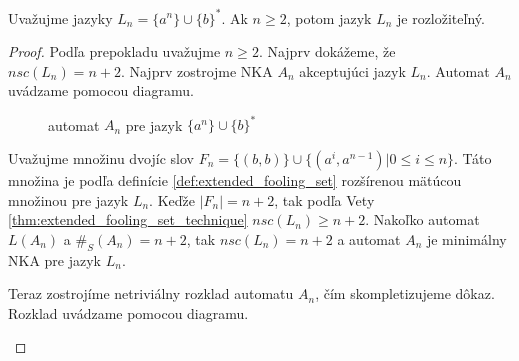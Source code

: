 \begin{proposition}
\label{thm:a^nub^*}
Uvažujme jazyky $ L_n = \lbrace a^{n} \rbrace \cup \lbrace b \rbrace^{*} $. Ak $ n \geq 2 $, potom jazyk $ L_n $ je rozložiteľný.
\end{proposition}

\begin{proof}
Podľa prepokladu uvažujme $ n \geq 2 $. Najprv dokážeme, že $ nsc(L_n) = n+2$. Najprv zostrojme NKA $ A_n $ akceptujúci jazyk $ L_n $. Automat $ A_n $ uvádzame pomocou diagramu.

\begin{figure}[H]
\centering
{}
\caption{automat $ A_n $ pre jazyk $ \lbrace a^{n} \rbrace \cup \lbrace b \rbrace^{*} $}
\label{fig:a^nub^*}
\end{figure}

Uvažujme množinu dvojíc slov $ F_n = \lbrace (b,b) \rbrace \cup \lbrace (a^i, a^{n-1}) | 0 \leq i \leq n \rbrace $. Táto množina je podľa definície \ref{def:extended_fooling_set} rozšírenou mätúcou množinou pre jazyk $ L_n $. Keďže $ |F_n| = n+2 $, tak podľa Vety \ref{thm:extended_fooling_set_technique} $ nsc(L_n) \geq n+2$. Nakoľko automat $ L(A_n) $ a $ \#_{S}(A_n) = n+2 $, tak $ nsc(L_n) = n+2$ a automat $ A_n $ je minimálny NKA pre jazyk $ L_n $.
\par
Teraz zostrojíme netriviálny rozklad automatu $ A_n $, čím skompletizujeme dôkaz. Rozklad uvádzame pomocou diagramu.

\begin{figure}[H]
\centering
{}
\end{figure}
\end{proof}
